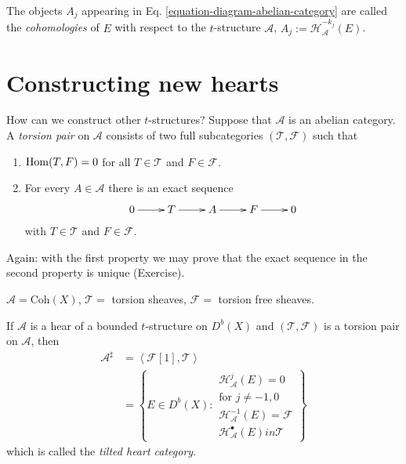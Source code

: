 \begin{definition}
\label{definition-cohomologies}
The objects $A_j$ appearing in Eq. \ref{equation-diagram-abelian-category} are
called the {\it cohomologies} of $E$ with respect to the $t$-structure
$\mathcal{A}$, $A_j:=\mathcal{H}_{\mathcal{A}}^{-k_j}(E)$.
\end{definition}

\section{Constructing new hearts}
\label{section-constructing-new-heats}

How can we construct other $t$-structures? Suppose that $\mathcal{A}$ is an
abelian category. A {\it torsion pair} on $\mathcal{A}$ consists of two full
subcategories $(\mathcal{T}, \mathcal{F})$ such that
\begin{enumerate}
\item $\mathop{\mathrm{Hom}}\nolimits(T,F)=0$ for all $T \in \mathcal{T}$ and $F \in \mathcal{F}$.
\item For every $A \in \mathcal{A}$ there is an exact sequence
$$
\xymatrix{
0\ar[r]&T\ar[r]&A\ar[r]&F\ar[r]&0
}
$$
with $T \in \mathcal{T}$ and $F \in \mathcal{F}$.
\end{enumerate}

Again: with the first property we may prove that the exact sequence in the
second property is unique (Exercise).

\begin{exercise}
\label{exercise-torsion-pair}
$\mathcal{A}=\text{Coh}(X)$, $\mathcal{T}=$ torsion sheaves, $\mathcal{F}=$
torsion free sheaves.
\end{exercise}

\begin{proposition}
\label{proposition-}
If $\mathcal{A}$ is a hear of a bounded $t$-structure on $D^b(X)$ and
$(\mathcal{T},\mathcal{F})$ is a torsion pair on $\mathcal{A}$, then
\begin{align*}
\mathcal{A}^\sharp&=\left<\mathcal{F}[1],\mathcal{T}\right>\\
&=\left\{E\in D^b(X):\substack{\mathcal{H}_{\mathcal{A}}^j(E)=0\\
\text{for $j \neq -1,0$} \\
\mathcal{H}_{\mathcal{A}}^{-1}(E)=\mathcal{F}\\
\mathcal{H}_{\mathcal{A}}^\bullet(E) in \mathcal{T} }\right\}
\end{align*}
which is called the {\it tilted heart category}.
\end{proposition}

